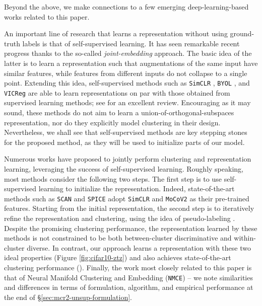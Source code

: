\documentclass[10pt,twocolumn,letterpaper]{article}
\begin{document}
Beyond the above, we make connections to a few emerging deep-learning-based works related to this paper. 

An important line of research that learns a representation without using ground-truth labels is that of self-supervised learning. It has seen remarkable recent progress thanks to the so-called \textit{joint-embedding} approach. The basic idea of the latter is to learn a representation such that augmentations of the same input have similar features, while features from different inputs do not collapse to a single point. Extending this idea, self-supervised methods such as \texttt{SimCLR} \cite{chen2020simple}, \texttt{BYOL} \cite{grill2020bootstrap}, and \texttt{VICReg} \cite{bardes2021vicreg} are able to learn representations on par with those obtained from supervised learning methods; see \cite{Shwartz-Ziv2023-vh} for an excellent review. Encouraging as it may sound, these methods do not aim to learn a union-of-orthogonal-subspaces representation, nor do they explicitly model clustering in their design.
Nevertheless, we shall see that self-supervised methods are key stepping stones for the proposed method, as they will be used to initialize parts of our model.

 Numerous works have proposed to jointly perform clustering and representation learning, leveraging the success of self-supervised learning. Roughly speaking, most methods consider the following two steps. The first step is to use self-supervised learning to initialize the representation. Indeed, state-of-the-art methods such as \texttt{SCAN} \cite{Van_Gansbeke2020-eo} and \texttt{SPICE} \cite{Niu2022-iq} adopt \texttt{SimCLR} \cite{chen2020simple} and \texttt{MoCoV2} \cite{Chen2020-ws}
as their pre-trained features. Starting from the initial representation, the second step is to iteratively refine the representation and clustering, using the idea of pseudo-labeling \cite{Caron2018-hb,Van_Gansbeke2020-eo,Park2021-jf,Niu2022-iq}.
Despite the promising clustering performance, the representation learned by these methods is not constrained to be both between-cluster discriminative and within-cluster diverse. In contrast, our approach learns a representation with these two ideal properties (Figure \ref{fig:cifar10-ztz}) and also achieves state-of-the-art clustering performance (). Finally, the work most closely related to this paper is that of Neural Manifold Clustering and Embedding (\texttt{NMCE}) \cite{Li2022-vq} -- we note similarities and differences in terms of formulation, algorithm, and empirical performance at the end of \S \ref{sec:mcr2-unsup-formulation}. 
\end{document}

